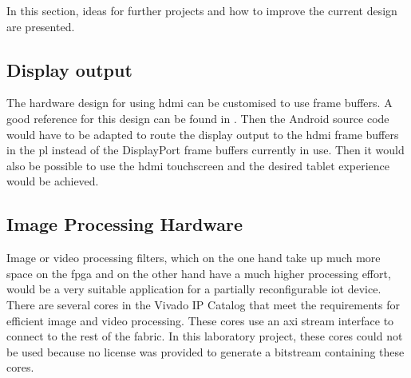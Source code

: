 In this section, ideas for further projects and how to improve the current
design are presented.

\subsection{Display output}
The hardware design for using \gls{hdmi} can be customised to use frame buffers. A good reference for this design can be found in \cite{framebufferdesign}. Then the Android source code would have to be adapted to route the display output to the \gls{hdmi} frame buffers in the \gls{pl} instead of the DisplayPort frame buffers currently in use. Then it would also be possible to use the \gls{hdmi} touchscreen and the desired tablet experience would be achieved.

\subsection{Image Processing Hardware}
Image or video processing filters, which on the one hand take up much more space on the \gls{fpga} and on the other hand have a much higher processing effort, would be a very suitable application for a partially reconfigurable \gls{iot} device. There are several cores in the Vivado IP Catalog that meet the requirements for efficient image and video processing. These cores use an \gls{axi} stream interface to connect to the rest of the fabric. In this laboratory project, these cores could not be used because no license was provided to generate a bitstream containing these cores.
